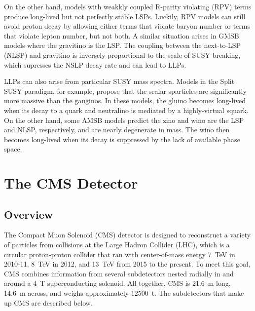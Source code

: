 \documentclass[12pt]{article}
\begin{document}

    On the other hand, models with weakkly coupled R-parity violating (RPV) terms produce long-lived but not perfectly stable LSPs. Luckily, RPV models can still avoid proton decay by allowing either terms that violate baryon number or terms that violate lepton number, but not both. A similar situation arises in GMSB models where the gravitino is the LSP. The coupling between the next-to-LSP (NLSP) and gravitino is inversely proportional to the scale of SUSY breaking, which supresses the NSLP decay rate and can lead to LLPs. 

    LLPs can also arise from particular SUSY mass spectra. Models in the Split  SUSY paradigm, for example, propose that the scalar sparticles are significantly more massive than the gauginos. In these models, the gluino becomes long-lived when its decay to a quark and neutralino is mediated by a highly-virtual squark.   On the other hand, some AMSB models predict the zino and wino are the LSP and NLSP, respectively, and are nearly degenerate in mass. The wino then becomes long-lived when its decay is suppressed by the lack of available phase space. 

\section{The CMS Detector}
\subsection{Overview}
    The Compact Muon Solenoid (CMS) detector is designed to reconstruct a variety of particles from collisions at the Large Hadron Collider (LHC), which is a circular proton-proton collider that ran with center-of-mass energy \SI{7}{\tera\electronvolt} in 2010-11, \SI{8}{\tera\electronvolt} in 2012, and \SI{13}{\tera\electronvolt} from 2015 to the present. To meet this goal, CMS combines information from several subdetectors nested radially in and around a \SI{4}{\tesla} superconducting solenoid. All together, CMS is \SI{21.6}{\m} long, \SI{14.6}{\m} across, and weighs approximately \SI{12500}{t}. The subdetectors that make up CMS are described below.
\end{document}
